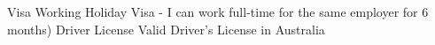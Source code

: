 

\begin{cvskills}
  \cvskill
    {Visa} %
    {Working Holiday Visa - I can work full-time for the same employer for 6 months)}
  \cvskill
    {Driver License} %
    {Valid Driver's License in Australia} %


\end{cvskills}

